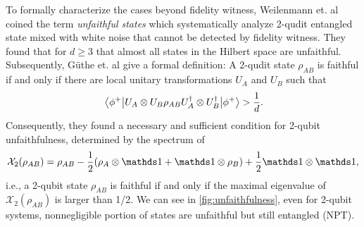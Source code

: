 \documentclass[
aps,
pra,
twocolumn,
floatfix,
]{revtex4-2}
\theoremstyle{plain}
\theoremstyle{definition}
\newtheorem{definition}{Definition}
\newcommand{\dm}{\rho}
\newcommand{\U}{U}
\begin{document}
To formally characterize the cases beyond fidelity witness, Weilenmann et. al \cite{weilenmannEntanglementDetectionMeasuring2020} coined the term \emph{unfaithful states} 
which systematically analyze 2-qudit entangled state mixed with white noise that cannot be detected by fidelity witness.
They found that for $d \ge 3$ that almost all states in the Hilbert space are unfaithful. 
Subsequently, G\"{u}the et. al \cite{guhneGeometryFaithfulEntanglement2021} \cite{riccardiExploringRelationshipFaithfulness2021} give a formal definition: 
	A 2-qudit state $\dm_{AB}$ is faithful if and only if there are local unitary transformations $\U_A$ and $\U_B$ such that
	\begin{equation}
		\expval{\U_A\otimes\U_B \dm_{AB} \U_A^\dagger \otimes\U_B^\dagger}{\phi^+}
		> \frac{1}{d}.
	\end{equation}
Consequently, they found a necessary and sufficient condition for 2-qubit unfaithfulness, determined by the spectrum of
\begin{equation}
	\mathcal{X}_2( \dm_{AB})=\rho_{AB}-\frac{1}{2}(\dm_{A}\otimes \identity + \identity \otimes \dm_{B})+\frac{1}{2} \identity \otimes \identity
	\label{eq:unfaithful_2qubit},
\end{equation}
i.e.,
a 2-qubit state $\dm_{AB}$ is faithful if and only if the maximal eigenvalue of $\mathcal{X}_2( \dm_{AB})$ is larger than 1/2.
We can see in \cref{fig:unfaithfulness}, even for 2-qubit systems, nonnegligible portion of states are unfaithful but still entangled (NPT).
\end{document}
